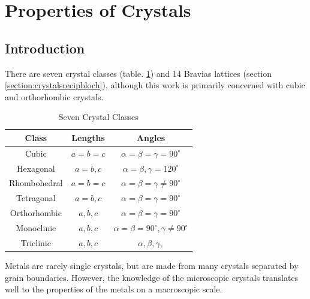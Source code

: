 
\section{Properties of Crystals}

\subsection{Introduction}

There are seven crystal classes (table. \ref{table:crystalclasses}) and 14 Bravias lattices (section \ref{section:crystalsrecipbloch}), although this work is primarily concerned with cubic and \gls{orthorhombic} crystals.    

\begin{table}[h]
\begin{center}
\renewcommand{\arraystretch}{1.2}
\begin{tabular}{c c c}
\hline\hline
Class & Lengths & Angles \\
\hline\hline
Cubic & $a = b = c$ & $ \alpha = \beta = \gamma = 90^{\circ}$ \\
Hexagonal & $a = b, c $ & $ \alpha = \beta, \gamma = 120^{\circ}$ \\
Rhombohedral & $a = b = c $ & $ \alpha = \beta = \gamma \neq 90^{\circ}$ \\
Tetragonal & $a = b, c $ & $ \alpha = \beta = \gamma = 90^{\circ}$ \\
Orthorhombic & $a, b, c $ & $ \alpha = \beta = \gamma = 90^{\circ}$ \\
Monoclinic & $a, b, c $ & $ \alpha = \beta = 90^{\circ}, \gamma \neq 90^{\circ} $ \\
Triclinic & $a, b, c $ & $ \alpha, \beta, \gamma, $ \\
\hline\hline
\end{tabular}
\caption{Seven Crystal Classes}
\label{table:crystalclasses}
\end{center}
\end{table}

Metals are rarely single crystals, but are made from many crystals separated by grain boundaries.  However, the knowledge of the microscopic crystals translates well to the properties of the metals on a macroscopic scale.

